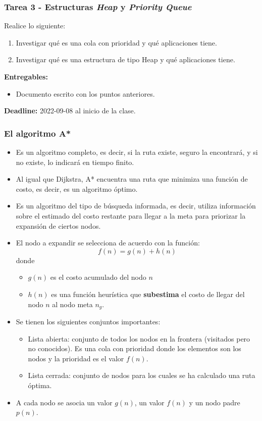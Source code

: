 \documentclass[10pt,spanish,aspectratio=1610]{beamer}
\begin{document}
\begin{frame}[containsverbatim]\frametitle{Tarea 3 - Estructuras \textit{Heap} y \textit{Priority Queue}}
  Realice lo siguiente:
  \begin{enumerate}
  \item Investigar qué es una cola con prioridad y qué aplicaciones tiene. 
  \item Investigar qué es una estructura de tipo Heap y qué aplicaciones tiene. 
  \end{enumerate}
  \textbf{Entregables:}
  \begin{itemize}
  \item Documento escrito con los puntos anteriores. 
  \end{itemize}
  \textbf{Deadline: } 2022-09-08 al inicio de la clase. 
\end{frame}


\begin{frame}\frametitle{El algoritmo A*}
  \begin{itemize}
  \item Es un algoritmo completo, es decir, si la ruta existe, seguro la encontrará, y si no existe, lo indicará en tiempo finito.
  \item Al igual que Dijkstra, A* encuentra una ruta que minimiza una función de costo, es decir, es un algoritmo óptimo.
  \item Es un algoritmo del tipo de búsqueda informada, es decir, utiliza información sobre el estimado del costo restante para llegar a la meta para priorizar la expansión de ciertos nodos. 
  \item El nodo a expandir se selecciona de acuerdo con la función:
    \[f(n) = g(n) + h(n)\]
    donde
    \begin{itemize}
    \item $g(n)$ es el costo acumulado del nodo $n$
    \item $h(n)$ es una función heurística que \textbf{subestima} el costo de llegar del nodo $n$ al nodo meta $n_g$. 
    \end{itemize}
  \item Se tienen los siguientes conjuntos importantes:
    \begin{itemize}
    \item Lista abierta: conjunto de todos los nodos en la frontera (visitados pero no conocidos). Es una cola con prioridad donde los elementos son los nodos y la prioridad es el valor $f(n)$.
    \item Lista cerrada: conjunto de nodos para los cuales se ha calculado una ruta óptima. 
    \end{itemize}
    \item A cada nodo se asocia un valor $g(n)$, un valor $f(n)$ y un nodo padre $p(n)$. 
  \end{itemize}
\end{frame}
\end{document}
